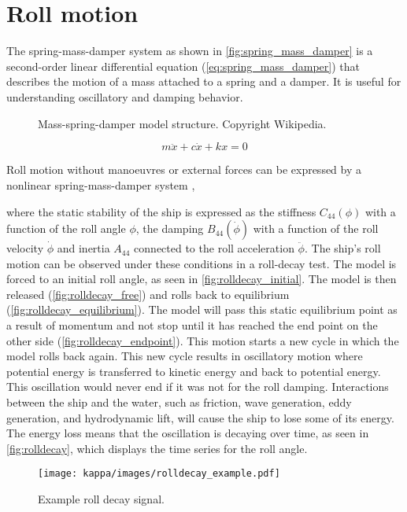 \section{Roll motion} \label{sec:roll}
The spring-mass-damper system as shown in \autoref{fig:spring_mass_damper} is a second-order linear differential equation (\autoref{eq:spring_mass_damper}) that describes the motion of a mass attached to a spring and a damper. It is useful for understanding oscillatory and damping behavior.
\begin{figure}[h]
    \centering
    
    \caption{Mass-spring-damper model structure. Copyright Wikipedia.}
    \label{fig:spring_mass_damper}
\end{figure}
\begin{equation} \label{eq:spring_mass_damper}
m\ddot{x} + c\dot{x} + kx = 0
\end{equation}

Roll motion without manoeuvres or external forces can be expressed by a nonlinear spring-mass-damper system \cite{himenoPredictionShipRoll1981},

where the static stability of the ship is expressed as the stiffness $C_{44}(\phi)$ with a function of the roll angle $\phi$, the damping $B_{44}(\dot{\phi})$ with a function of the roll velocity $\dot{\phi}$ and inertia $A_{44}$ connected to the roll acceleration $\ddot{\phi}$. The ship's roll motion can be observed under these conditions in a roll-decay test. The model is forced to an initial roll angle, as seen in \autoref{fig:rolldecay_initial}. The model is then released (\autoref{fig:rolldecay_free}) and rolls back to equilibrium (\autoref{fig:rolldecay_equilibrium}). The model will pass this static equilibrium point as a result of momentum and not stop until it has reached the end point on the other side (\autoref{fig:rolldecay_endpoint}). This motion starts a new cycle in which the model rolls back again. This new cycle results in oscillatory motion where potential energy is transferred to kinetic energy and back to potential energy.
This oscillation would never end if it was not for the roll damping. Interactions between the ship and the water, such as friction, wave generation, eddy generation, and hydrodynamic lift, will cause the ship to lose some of its energy. The energy loss means that the oscillation is decaying over time, as seen in \autoref{fig:rolldecay}, which displays the time series for the roll angle.

\begin{figure}[H]
    \centering
    \texttt{[image: kappa/images/rolldecay\_example.pdf]}
    \caption{Example roll decay signal.}
    \label{fig:rolldecay}
\end{figure}

